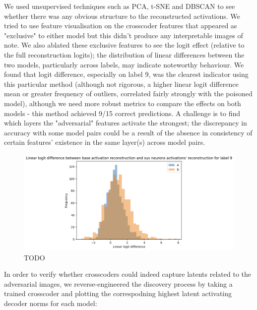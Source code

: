 \documentclass[letterpaper]{article} %
\begin{document}
We used unsupervised techniques such as PCA, t-SNE and DBSCAN to see whether there was any obvious structure to the reconstructed activations. We tried to use feature visualisation on the crosscoder features that appeared as "exclusive" to either model but this didn't produce any interpretable images of note. We also ablated these exclusive features to see the logit effect (relative to the full reconstruction logits); the distribution of linear differences between the two models, particularly across labels, may indicate noteworthy behaviour. We found that logit difference, especially on label 9, was the clearest indicator using this particular method (although not rigorous, a higher linear logit difference mean or greater frequency of outliers, correlated fairly strongly with the poisoned model), although we need more robust metrics to compare the effects on both models - this method achieved 9/15 correct predictions. A challenge is to find which layers the "adversarial" features activate the strongest; the discrepancy in accuracy with some model pairs could be a result of the absence in consistency of certain features' existence in the same layer(s) across model pairs.

\begin{figure}[h!]
\centering
\includegraphics[width=\columnwidth]{figures/round_1_logit_effect.png}
\caption{TODO}
\end{figure}

In order to verify whether crosscoders could indeed capture latents related to the adversarial images, we reverse-engineered the discovery process by taking a trained crosscoder and plotting the correspodning highest latent activating decoder norms for each model:
\end{document}
